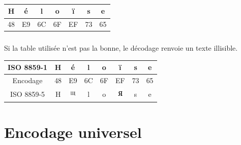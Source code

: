 \documentclass[svgnames,11pt]{beamer}
\begin{document}
\begin{frame}
    \frametitle{}

    \begin{center}
        \begin{tabular}{|*{7}{c|}}
            \hline
            H&é&l&o&ï&s&e\\
            \hline
            48&E9&6C&6F&EF&73&65\\
            \hline
        \end{tabular}
    \end{center}

\end{frame}
\begin{frame}
    \frametitle{}

    \begin{aretenir}[Remarque]
    Si la table utilisée n'est pas la bonne, le décodage renvoie un texte illisible. 
    \begin{center}
        \begin{tabular}{|*{8}{c|}}
            \hline
            ISO 8859-1&H&é&l&o&ï&s&e\\
            \hline
            Encodage&48&E9&6C&6F&EF&73&65\\
            \hline
            ISO 8859-5&H&\includegraphics[width=1em]{ressources/l1.png}&l&o&\includegraphics[width=1em]{ressources/l2.png}&s&e\\
            \hline
        \end{tabular}
    \end{center}
    \end{aretenir}
\end{frame}
\section{Encodage universel}
\end{document}
